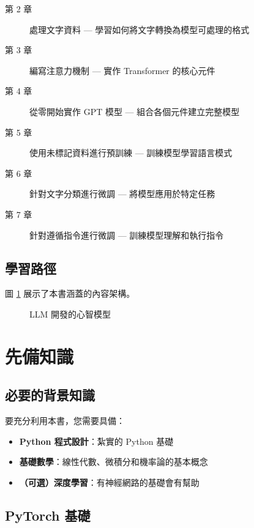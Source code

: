 \begin{description}
    \item[第 2 章] 處理文字資料 --- 學習如何將文字轉換為模型可處理的格式
    \item[第 3 章] 編寫注意力機制 --- 實作 Transformer 的核心元件
    \item[第 4 章] 從零開始實作 GPT 模型 --- 組合各個元件建立完整模型
    \item[第 5 章] 使用未標記資料進行預訓練 --- 訓練模型學習語言模式
    \item[第 6 章] 針對文字分類進行微調 --- 將模型應用於特定任務
    \item[第 7 章] 針對遵循指令進行微調 --- 訓練模型理解和執行指令
\end{description}

\subsection{學習路徑}

圖 \ref{fig:mental-model} 展示了本書涵蓋的內容架構。

\begin{figure}[H]
    \centering
    \caption{LLM 開發的心智模型}
    \label{fig:mental-model}
\end{figure}

\section{先備知識}

\subsection{必要的背景知識}

要充分利用本書，您需要具備：

\begin{itemize}
    \item \textbf{Python 程式設計}：紮實的 Python 基礎
    \item \textbf{基礎數學}：線性代數、微積分和機率論的基本概念
    \item \textbf{（可選）深度學習}：有神經網路的基礎會有幫助
\end{itemize}

\subsection{PyTorch 基礎}

